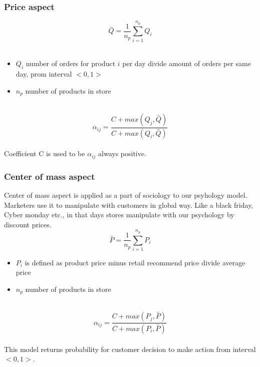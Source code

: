 \subsubsection{Price aspect} \label{subsubsec:model_psychology_price}
\begin{equation} \label{eq:26}
\overset{-}{Q} = \frac{1}{n_p} \sum_{i=1}^{n_p} Q_i
\end{equation}
\\
\begin{itemize}
    \item $Q_i$ number of orders for product $i$ per day divide amount of orders per same day, prom interval $<0,1>$
    \item $n_p$ number of products in store
\end{itemize}
\\
\begin{equation} \label{eq:27}
\alpha_{ij} = \frac{C+max(Q_j, \overset{-}{Q})}{C+max(Q_i, \overset{-}{Q})}
\end{equation}
\\
Coefficient C is used to be $\alpha_{ij}$ always positive.
\subsubsection{Center of mass aspect} \label{subsubsec:model_psychology_mass}
Center of mass aspect is applied as a part of sociology to our psyhology model.
Marketers use it to manipulate with customers in global way.
Like a black friday, Cyber monday etc., in that days stores manipulate with our psychology by discount prices.
\\
\begin{equation} \label{eq:28}
\overset{-}{P} = \frac{1}{n_p} \sum_{i=1}^{n_p} P_i
\end{equation}
\begin{itemize}
    \item $P_i$ is defined as product price minus retail recommend price divide average price
    \item $n_p$ number of products in store
\end{itemize}
\\
\begin{equation} \label{eq:29}
\alpha_{ij} = \frac{C+max(P_j, \overset{-}{P})}{C+max(P_i, \overset{-}{P})}
\end{equation}
\\
This model returns probability for customer decision to make action from interval $<0,1>$.
\\
